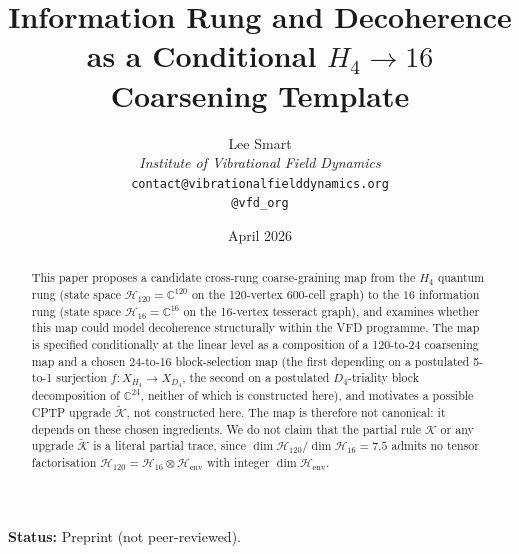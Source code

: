 \documentclass[12pt]{article}
\title{Information Rung and Decoherence as a Conditional $H_4 \to 16$ Coarsening Template}
\author{%
  Lee Smart\\[4pt]
  \textit{Institute of Vibrational Field Dynamics}\\[2pt]
  \texttt{contact@vibrationalfielddynamics.org}\\[2pt]
  \texttt{@vfd\_org}%
}
\date{April 2026}
\theoremstyle{definition}
\theoremstyle{remark}
\newcommand{\Hcal}{\mathcal{H}}
\newcommand{\Kcal}{\mathcal{K}}
\begin{document}
\maketitle

\noindent\textbf{Status:} Preprint (not peer-reviewed).

\begin{abstract}
This paper proposes a candidate cross-rung coarse-graining map from the $H_4$ quantum rung (state space $\Hcal_{120} = \mathbb{C}^{120}$ on the 120-vertex 600-cell graph) to the $16$ information rung (state space $\Hcal_{16} = \mathbb{C}^{16}$ on the 16-vertex tesseract graph), and examines whether this map could model decoherence structurally within the VFD programme. The map is specified conditionally at the linear level as a composition of a 120-to-24 coarsening map and a chosen 24-to-16 block-selection map (the first depending on a postulated 5-to-1 surjection $f: X_{H_4} \to X_{D_4}$, the second on a postulated $D_4$-triality block decomposition of $\mathbb{C}^{24}$, neither of which is constructed here), and motivates a possible CPTP upgrade $\widetilde{\Kcal}$, not constructed here. The map is therefore not canonical: it depends on these chosen ingredients. We do not claim that the partial rule $\Kcal$ or any upgrade $\widetilde{\Kcal}$ is a literal partial trace, since $\dim \Hcal_{120}/\dim \Hcal_{16} = 7.5$ admits no tensor factorisation $\Hcal_{120} = \Hcal_{16} \otimes \Hcal_{\mathrm{env}}$ with integer $\dim \Hcal_{\mathrm{env}}$.


\end{abstract}
\end{document}
